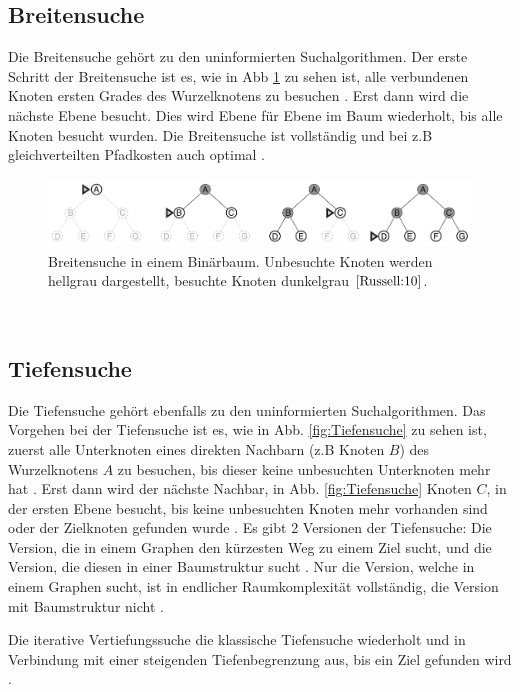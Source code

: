 \subsection{Breitensuche}
\label{Breitensuche}
Die Breitensuche gehört zu den uninformierten Suchalgorithmen. 
Der erste Schritt der Breitensuche ist es, wie in Abb \ref{fig:Breitensuche} zu sehen ist, alle verbundenen Knoten ersten Grades des Wurzelknotens zu besuchen \cite[80-82]{Russell:10}.
Erst dann wird die nächste Ebene besucht. Dies wird Ebene für Ebene im Baum wiederholt, bis alle Knoten besucht wurden. 
Die Breitensuche ist vollständig und bei z.B gleichverteilten Pfadkosten auch optimal \cite[80-82]{Russell:10}.
\begin{figure}
	\centering
	\includegraphics[width=1.0\textwidth]{images/breitensuche.png}
	\caption{Breitensuche in einem Binärbaum. Unbesuchte Knoten werden hellgrau dargestellt, besuchte Knoten dunkelgrau $\cite[82]{Russell:10}$.}
	\label{fig:Breitensuche}
\end{figure}
\\
\newpage
\subsection{Tiefensuche}
\label{Tiefensuche}
Die Tiefensuche gehört ebenfalls zu den uninformierten Suchalgorithmen.
Das Vorgehen bei der Tiefensuche ist es, wie in Abb. \ref{fig:Tiefensuche} zu sehen ist, zuerst alle Unterknoten eines direkten Nachbarn (z.B Knoten $B$) des Wurzelknotens $A$ zu besuchen, bis dieser 
keine unbesuchten Unterknoten mehr hat \cite[85,86]{Russell:10}.
Erst dann wird der nächste Nachbar, in Abb. \ref{fig:Tiefensuche} Knoten $C$, in der ersten Ebene besucht, bis keine unbesuchten Knoten mehr vorhanden sind oder der Zielknoten gefunden wurde \cite[85,86]{Russell:10}.
Es gibt 2 Versionen der Tiefensuche: Die Version, die in einem Graphen den kürzesten Weg zu einem Ziel sucht, und die Version, 
die diesen in einer Baumstruktur sucht \cite[85,86]{Russell:10}.
Nur die Version, welche in einem Graphen sucht, ist in endlicher Raumkomplexität vollständig, die Version mit Baumstruktur nicht \cite[85,86]{Russell:10}.
 
Die iterative Vertiefungssuche die klassische Tiefensuche wiederholt und in Verbindung mit einer steigenden 
Tiefenbegrenzung aus, bis ein Ziel gefunden wird \cite[108,109]{Russell:10}.

